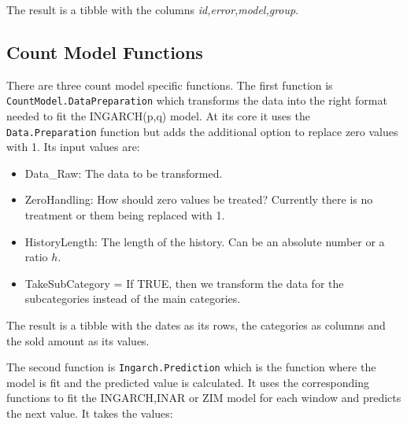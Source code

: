 The result is a tibble with the columns \textit{id,error,model,group}. 

\subsection{Count Model Functions}
\label{sec:Count Model Functions}


There are three count model specific functions. The first function is \texttt{CountModel.DataPreparation} which transforms the data into the right format needed to fit the INGARCH(p,q) model. At its core it uses the \texttt{Data.Preparation} function but adds the additional option to replace zero values with 1. Its input values are:

\begin{itemize}
	\item Data\_Raw: The data to be transformed.
	\item ZeroHandling: How should zero values be treated? Currently there is no treatment or them being replaced with 1. 
	\item HistoryLength: The length of the history. Can be an absolute number or a ratio $h$. 
	\item TakeSubCategory = If TRUE, then we transform the data for the subcategories instead of the main categories. 
\end{itemize}

The result is a tibble with the dates as its rows, the categories as columns and the sold amount as its values.

The second function is \texttt{Ingarch.Prediction} which is the function where the model is fit and the predicted value is calculated. It uses the corresponding functions to fit the INGARCH,INAR or ZIM model for each window and predicts the next value. It takes the values:

